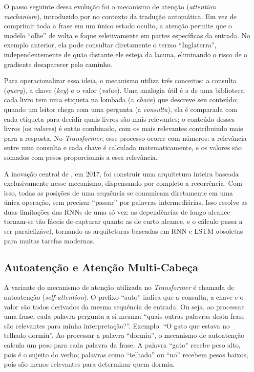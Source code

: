 O passo seguinte dessa evolução foi o mecanismo de atenção (\textit{attention
mechanism}), introduzido por  no contexto da tradução automática.
Em vez de comprimir toda a frase em um único estado oculto, a atenção permite que o modelo
``olhe'' de volta e foque seletivamente em partes específicas da entrada. No exemplo
anterior, ela pode consultar diretamente o termo ``Inglaterra'', independentemente de quão
distante ele esteja da lacuna, eliminando o risco de o gradiente desaparecer pelo caminho.

Para operacionalizar essa ideia, o mecanismo utiliza três conceitos: a consulta
(\textit{query}), a chave (\textit{key}) e o valor (\textit{value}). Uma analogia útil é a
de uma biblioteca: cada livro tem uma etiqueta na lombada (a \textit{chave}) que descreve
seu conteúdo; quando um leitor chega com uma pergunta (a \textit{consulta}), ela é comparada
com cada etiqueta para decidir quais livros são mais relevantes; o conteúdo desses livros
(os \textit{valores}) é então combinado, com os mais relevantes contribuindo mais para a
resposta. No \textit{Transformer}, esse processo ocorre com números: a relevância entre uma
consulta e cada chave é calculada matematicamente, e os valores são somados com pesos
proporcionais a essa relevância.

A inovação central de , em 2017, foi construir uma arquitetura
inteira baseada exclusivamente nesse mecanismo, dispensando por completo a recorrência.
Com isso, todas as posições de uma sequência se comunicam diretamente em uma única
operação, sem precisar ``passar'' por palavras intermediárias. Isso resolve as duas
limitações das RNNs de uma só vez: as dependências de longo alcance tornam-se tão fáceis
de capturar quanto as de curto alcance, e o cálculo passa a ser paralelizável, tornando
as arquiteturas baseadas em RNN e LSTM obsoletas para muitas tarefas modernas.

\subsection{Autoatenção e Atenção Multi-Cabeça}\label{subsec:autoatencao}

A variante do mecanismo de atenção utilizada no \textit{Transformer} é chamada de
autoatenção (\textit{self-attention}). O prefixo ``auto'' indica que a consulta, a chave
e o valor são todos derivados da mesma sequência de entrada. Ou seja,
ao processar uma frase, cada palavra pergunta a si mesma: ``quais outras palavras desta
frase são relevantes para minha interpretação?''. Exemplo: ``O gato que estava
no telhado dormiu''. Ao processar a palavra ``dormiu'', o mecanismo de autoatenção
calcula um peso para cada palavra da frase. A palavra ``gato'' recebe peso alto, pois é
o sujeito do verbo; palavras como ``telhado'' ou ``no'' recebem pesos baixos, pois são
menos relevantes para determinar quem dormiu.

